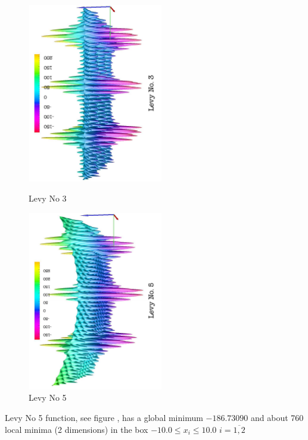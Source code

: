 \begin{figure}[tb]
\begin{minipage}[tb]{7.6cm}
\begin{center}
\includegraphics[width=5.9cm,angle=-90]{figures/levy3}
\caption{\label{levy3} Levy No 3  }
\end{center}
\end{minipage}
%
\begin{minipage}[tb]{7.6cm}
\begin{center}
\includegraphics[width=59mm,angle=-90]{figures/levy5}
\caption{\label{levy5} Levy No 5  }
\end{center}
\end{minipage}
\end{figure}
\par{Levy No 5 function, see figure ,  has a global minimum
$-186.73090$  and about 760 local minima (2 dimensions) in the box
$-10.0\leq x_i \leq 10.0$ $i=\overline{1,2}$}
